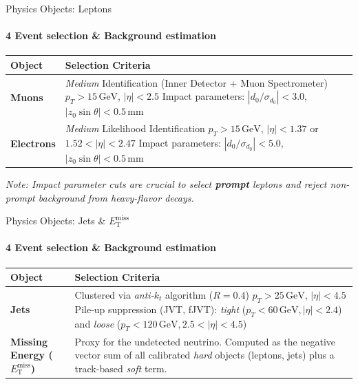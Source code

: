 \begin{frame}{Physics Objects: Leptons}
    \framesubtitle{4 Event selection \& Background estimation}
    \vspace{-0.1cm}
    \begin{table}[htbp]
    \centering
    \small %
    \renewcommand{\arraystretch}{1.25} %
    \begin{tabular}{p{2.2cm} p{8.3cm}}
    \hline
    \textbf{Object} & \textbf{Selection Criteria} \\
    \hline
    \textbf{Muons} & \textit{Medium} Identification (Inner Detector + Muon Spectrometer) \newline
    $p_T > 15\,\mathrm{GeV}$, $|\eta| < 2.5$ \newline
    Impact parameters: $|d_0/\sigma_{d_0}| < 3.0$, $|z_0 \sin\theta| < 0.5\,\mathrm{mm}$ \\
    \hline
    \textbf{Electrons} & \textit{Medium} Likelihood Identification \newline
    $p_T > 15\,\mathrm{GeV}$, $|\eta| < 1.37$ or $1.52 < |\eta| < 2.47$ \newline
    Impact parameters: $|d_0/\sigma_{d_0}| < 5.0$, $|z_0 \sin\theta| < 0.5\,\mathrm{mm}$ \\
    \hline
    \end{tabular}
    \end{table}
    \vspace{0.1cm}
    \footnotesize \textit{Note: Impact parameter cuts are crucial to select \textbf{prompt} leptons and reject non-prompt background from heavy-flavor decays.}
\end{frame}

\begin{frame}{Physics Objects: Jets \& $E_{\mathrm{T}}^{\mathrm{miss}}$}
    \framesubtitle{4 Event selection \& Background estimation}
    \begin{table}[htbp]
    \centering
    \small
    \renewcommand{\arraystretch}{1.3}
    \begin{tabular}{p{2.5cm} p{8.0cm}}
    \hline
    \textbf{Object} & \textbf{Selection Criteria} \\
    \hline
    \textbf{Jets} & Clustered via \textit{anti-$k_t$} algorithm ($R=0.4$) \newline
    $p_T > 25\,\mathrm{GeV}$, $|\eta| < 4.5$ \newline
    Pile-up suppression (JVT, fJVT): \textit{tight} ($p_T < 60\,\mathrm{GeV},$\newline $|\eta| < 2.4$) and \textit{loose} ($p_T < 120\,\mathrm{GeV}, 2.5 < |\eta| < 4.5$) \\
    \hline
    \textbf{Missing Energy ($E_{\mathrm{T}}^{\mathrm{miss}}$)} & Proxy for the undetected neutrino. \newline Computed as the negative vector sum of all calibrated \textit{hard} objects (leptons, jets) plus a track-based \textit{soft} term. \\
    \hline
    \end{tabular}
    \end{table}
\end{frame}

